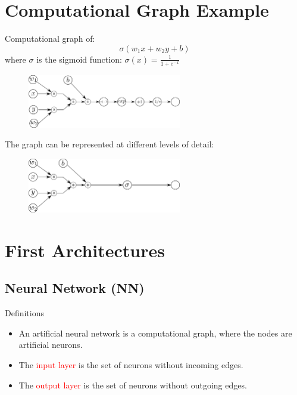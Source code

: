 \documentclass{book}
\newcommand{\alert}[1]{\textcolor{red}{#1}}
\begin{document}
\section{Computational Graph Example}

Computational graph of:
\[
\sigma(w_1x + w_2y + b)
\]
where $\sigma$ is the sigmoid function: $\sigma(x) = \frac{1}{1 + e^{-x}}$

\begin{figure}[h]
    \centering
    \includegraphics[width=0.6\textwidth]{comp_graph2}
\end{figure}

The graph can be represented at different levels of detail:
\begin{figure}[h]
    \centering
    \includegraphics[width=0.6\textwidth]{comp_graph}
\end{figure}

\section{First Architectures}

\subsection{Neural Network (NN)}

\begin{block}{Definitions}
\begin{itemize}
\item An artificial neural network is a computational graph, where the nodes are artificial neurons.
\item The \alert{input layer} is the set of neurons without incoming edges.
\item The \alert{output layer} is the set of neurons without outgoing edges.
\end{itemize}
\end{block}
\end{document}
